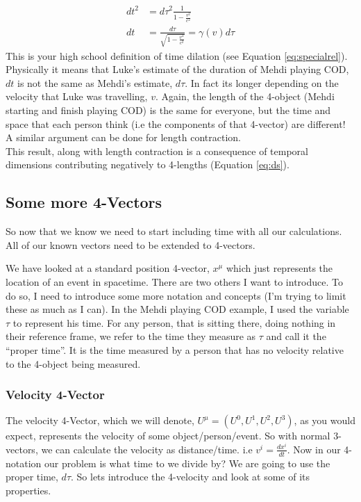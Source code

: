 \begin{equation}
  \begin{aligned}
  dt^2 &= d\tau^2 \frac{1}{1  - \frac{v^2}{c^2}} \\
  dt &= \frac{d \tau}{\sqrt{1 - \frac{v^2}{c^2}}} = \gamma(v) d\tau
  \label{eq:dtgamma}
\end{aligned}
\end{equation}
This is your high school definition of time dilation (see Equation \eqref{eq:specialrel}). Physically it means that Luke's estimate of the duration of Mehdi playing COD, $dt$ is not the same as Mehdi's estimate, $d\tau$. In fact its longer depending on the velocity that Luke was travelling, $v$. Again, the length of the 4-object (Mehdi starting and finish playing COD) is the same for everyone, but the time and space that each person think (i.e the components of that 4-vector) are different! \\
A similar argument can be done for length contraction. \\

This result, along with length contraction is a consequence of temporal dimensions contributing negatively to 4-lengths (Equation \eqref{eq:ds}).


\subsection{Some more 4-Vectors}
So now that we know we need to start including time with all our calculations. All of our known vectors need to be extended to 4-vectors. 

We have looked at a standard position 4-vector, $x^\mu$ which just represents the location of an event in spacetime. There are two others I want to introduce. To do so, I need to introduce some more notation and concepts (I'm trying to limit these as much as I can). In the Mehdi playing COD example, I used the variable $\tau$ to represent his time. For any person, that is sitting there, doing nothing in their reference frame, we refer to the time they measure as $\tau$ and call it the ``proper time''. It is the time measured by a person that has no velocity relative to the 4-object being measured.  

\subsubsection{Velocity 4-Vector}
The velocity 4-Vector, which we will denote, $U^\mu = (U^0, U^1, U^2, U^3)$, as you would expect, represents the velocity of some object/person/event. So with normal 3-vectors, we can calculate the velocity as distance/time. i.e $v^i = \frac{dx^i}{dt}$. Now in our 4-notation our problem is what time to we divide by? We are going to use the proper time, $d\tau$. So lets introduce the 4-velocity and look at some of its properties. 

